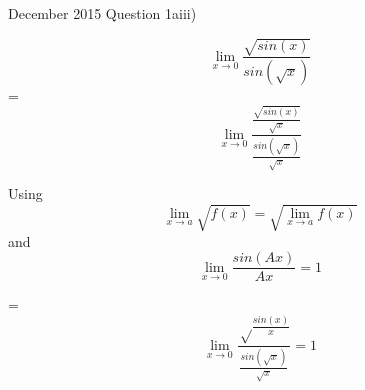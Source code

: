 \documentclass{article}
\begin{document}
December 2015 Question 1aiii)

$$ \lim_{x \to 0} \frac{\sqrt{sin(x)}}{sin(\sqrt{x})} $$ = 
$$ \lim_{x \to 0} \frac{\frac{\sqrt{sin(x)}}{\sqrt{{x}}}}{\frac{sin(\sqrt{x})}{\sqrt{x}}} $$ 

Using $$ \lim_{x \to a} \sqrt{f(x)} =  \sqrt{\lim_{x \to a} f(x)}$$
and $$ \lim_{x \to 0} \frac{sin(Ax)}{Ax} = 1 $$

=
$$ \lim_{x \to 0} \frac{\sqrt\frac{sin(x)}{x}}{\frac{sin(\sqrt{x})}{\sqrt{x}}} = 1 $$
\end{document}
